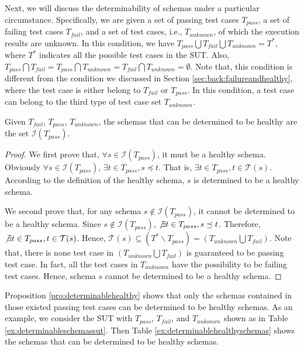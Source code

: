 Next, we will discuss the determinability of schemas under a particular circumstance. Specifically, we are given a set of passing test cases $T_{pass}$, a set of failing test cases $T_{fail}$, and a set of test cases, i.e., $T_{unknown}$, of which the execution results are unknown.  In this condition, we have $T_{pass} \bigcup T_{fail} \bigcup T_{unknown} =  T^{*}$, where $T^{*}$ indicates all the possible test cases in the SUT. Also, $T_{pass} \bigcap T_{fail} = T_{pass} \bigcap T_{unknown} = T_{fail} \bigcap T_{unknown} = \emptyset$. Note that, this condition is different from the condition we discussed in Section \ref{sec:back:failureandhealthy}, where the test case is either belong to $T_{fail}$ or $T_{pass}$. In this condition, a test case can belong to the third type of test case set $T_{unknown}$.



\begin{proposition}\label{pro:determinablehealthy}
Given  $T_{fail}$, $T_{pass}$, $T_{unknown}$, the schemas that can be determined to be healthy are the set $\mathcal{I}(T_{pass})$.
\end{proposition}

\begin{proof}
We first prove that, $\forall s \in \mathcal{I}(T_{pass})$, it must be a healthy schema.
Obviously $\forall s \in \mathcal{I}(T_{pass})$, $\exists t \in T_{pass}, s \preceq t$. That is, $\exists t \in T_{pass}, t \in \mathcal{T}(s)$. According to the definition of the healthy schema, $s$ is determined to be a healthy schema.

We second prove that, for any schema $s \not\in \mathcal{I}(T_{pass})$, it cannot be determined to be a healthy schema. Since $s \not\in \mathcal{I}(T_{pass})$, $\not\exists t \in T_{pass}, s \preceq t$. Therefore,  $\not\exists t \in T_{pass}, t \in \mathcal{T}(s)$. Hence, $\mathcal{T}(s) \subseteq (T^{*} \backslash T_{pass}) = (T_{unknown} \bigcup T_{fail})$. Note that, there is none test case in $(T_{unknown} \bigcup T_{fail})$ is guaranteed to be passing test case. In fact, all the test cases in $T_{unknown}$ have the possibility to be failing test cases. Hence, schema $s$ cannot be determined to be a healthy schema.
\end{proof}

Proposition \ref{pro:determinablehealthy} shows that only the schemas contained in those existed passing test cases can be determined to be healthy schemas.  As an example, we consider the SUT with $T_{pass}$, $T_{fail}$, and $T_{unkonwn}$ shown as in Table \ref{ex:determinableschemassut}.  Then Table \ref{ex:determinablehealthyschemas} shows the schemas that can be determined to be healthy schemas.

